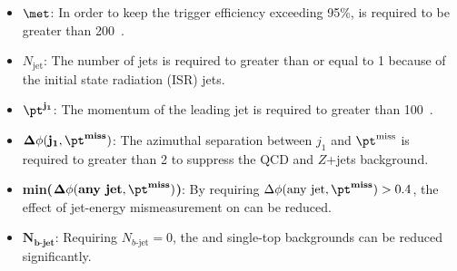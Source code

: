 \begin{itemize}
    \item $\mathbf{\met}$: In order to keep the \met trigger efficiency exceeding 95\%, \met is required to be greater than 200~{\GeV}.

    \item $N_{\mathrm{jet}}$: The number of jets is required to greater than or equal to 1 because of the initial state radiation (ISR) jets.

    \item $\mathbf{\pt^{j_{1}}}$: The momentum of the leading jet is required to greater than 100~{\GeV}.

    \item $\mathbf{\Delta \phi(j_{1}, \pt^{\textbf{miss}})}$: The azimuthal separation between $j_{1}$ and $\mathbf{\pt^{\textrm{miss}}}$ is required to greater than 2 to suppress the QCD and $Z$+jets background.

    \item \textbf{min($\mathbf{\Delta \phi(\textbf{any jet}, \pt^{\textbf{miss}})}$)}: By requiring $\Delta \phi(\textrm{any jet}, \pt^{\textbf{miss}}) > 0.4$, the effect of jet-energy mismeasurement on \met can be reduced.

    \item $\mathbf{N}_{\mathbf{b}\textbf{-jet}}$: Requiring $N_{b\textrm{-jet}} = 0$, the \ttbar and single-top backgrounds can be reduced significantly.


\end{itemize}

